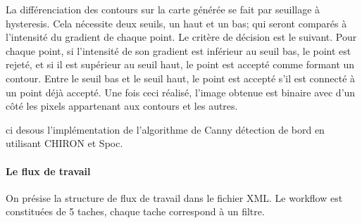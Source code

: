 La différenciation des contours sur la carte générée se fait par seuillage à hysteresis. Cela nécessite deux seuils, un haut et un bas; qui seront comparés à l'intensité du gradient de chaque point. Le critère de décision est le suivant. Pour chaque point, si l'intensité de son gradient est inférieur au seuil bas, le point est rejeté, et si il est supérieur au seuil haut, le point est accepté comme formant un contour. Entre le seuil bas et le seuil haut, le point est accepté s'il est connecté à un point déjà accepté. Une fois ceci réalisé, l'image obtenue est binaire avec d'un côté les pixels appartenant aux contours et les autres.


ci desous l'implémentation de l'algorithme de Canny détection de bord en utilisant CHIRON et Spoc.


\paragraph{Le flux de travail}


On présise la structure de flux de travail dans le fichier XML. Le workflow est constituées de 5 taches, chaque tache correspond à un filtre.









